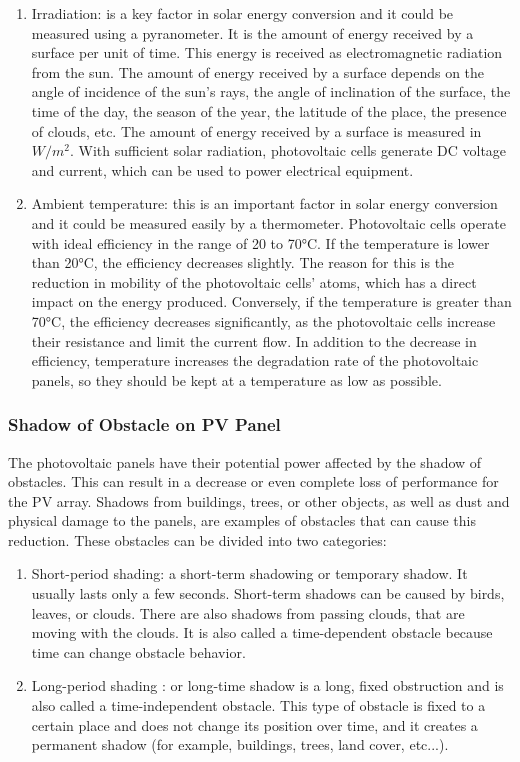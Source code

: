 \documentclass{report}
\begin{document}
\begin{enumerate}
    \item Irradiation: is a key factor in solar energy conversion and it could be measured using a pyranometer. It is the amount of energy received by a surface per unit of time. This energy is received as electromagnetic radiation from the sun. The amount of energy received by a surface depends on the angle of incidence of the sun's rays, the angle of inclination of the surface, the time of the day, the season of the year, the latitude of the place, the presence of clouds, etc. The amount of energy received by a surface is measured in $W/m^2$. With sufficient solar radiation, photovoltaic cells generate DC voltage and current, which can be used to power electrical equipment.
    \item Ambient temperature: this is an important factor in solar energy conversion and it could be measured easily by a thermometer. Photovoltaic cells operate with ideal efficiency in the range of 20 to 70°C. If the temperature is lower than 20°C, the efficiency decreases slightly. The reason for this is the reduction in mobility of the photovoltaic cells' atoms, which has a direct impact on the energy produced. Conversely, if the temperature is greater than 70°C, the efficiency decreases significantly, as the photovoltaic cells increase their resistance and limit the current flow. In addition to the decrease in efficiency, temperature increases the degradation rate of the photovoltaic panels, so they should be kept at a temperature as low as possible.
\end{enumerate}

\subsubsection{Shadow of Obstacle on PV Panel}

The photovoltaic panels have their potential power affected by the shadow of obstacles. This can result in a decrease or even complete loss of performance for the PV array. Shadows from buildings, trees, or other objects, as well as dust and physical damage to the panels, are examples of obstacles that can cause this reduction. These obstacles can be divided into two categories:
\begin{enumerate}
    \item Short-period shading: a short-term shadowing or temporary shadow. It usually lasts only a few seconds. Short-term shadows can be caused by birds, leaves, or clouds. There are also shadows from passing clouds, that are moving with the clouds.  It is also called a time-dependent obstacle because time can change obstacle behavior.
    \item Long-period shading : or long-time shadow is a long, fixed obstruction and is also called a time-independent obstacle. This type of obstacle is fixed to a certain place and does not change its position over time, and it creates a permanent shadow (for example, buildings, trees, land cover, etc...). 
\end{enumerate}
\end{document}

